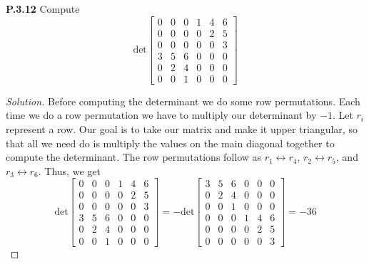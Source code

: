 \documentclass[12pt]{amsart}
\newenvironment{solution}
{\begin{proof}[Solution]}
{\end{proof}}
\begin{document}
\begin{onehalfspace}
        \noindent\textbf{P.3.12} Compute
        \begin{displaymath}
            \text{det}\left[\begin{matrix}
                0 & 0 & 0 & 1 & 4 & 6\\
                0 & 0 & 0 & 0 & 2 & 5\\
                0 & 0 & 0 & 0 & 0 & 3\\
                3 & 5 & 6 & 0 & 0 & 0\\
                0 & 2 & 4 & 0 & 0 & 0\\
                0 & 0 & 1 & 0 & 0 & 0
            \end{matrix}\right]
        \end{displaymath}
        \begin{solution}
            Before computing the determinant we do some row permutations.
            Each time we do a row permutation we have to multiply our determinant by $-1$.
            Let $r_i$ represent a row.
            Our goal is to take our matrix and make it upper triangular, so that all we need do is multiply the values
            on the main diagonal together to compute the determinant.
            The row permutations follow as $r_1 \leftrightarrow r_4$, $r_2 \leftrightarrow r_5$, and $r_3 \leftrightarrow r_6$.
            Thus, we get
            \begin{displaymath}
                \text{det}\left[\begin{matrix}
                                    0 & 0 & 0 & 1 & 4 & 6\\
                                    0 & 0 & 0 & 0 & 2 & 5\\
                                    0 & 0 & 0 & 0 & 0 & 3\\
                                    3 & 5 & 6 & 0 & 0 & 0\\
                                    0 & 2 & 4 & 0 & 0 & 0\\
                                    0 & 0 & 1 & 0 & 0 & 0
                \end{matrix}\right] =
                -\text{det}\left[\begin{matrix}
                                    3 & 5 & 6 & 0 & 0 & 0\\
                                    0 & 2 & 4 & 0 & 0 & 0\\
                                    0 & 0 & 1 & 0 & 0 & 0\\
                                    0 & 0 & 0 & 1 & 4 & 6\\
                                    0 & 0 & 0 & 0 & 2 & 5\\
                                    0 & 0 & 0 & 0 & 0 & 3
                \end{matrix}\right] = -36
            \end{displaymath}
        \end{solution}


\end{onehalfspace}
\end{document}
